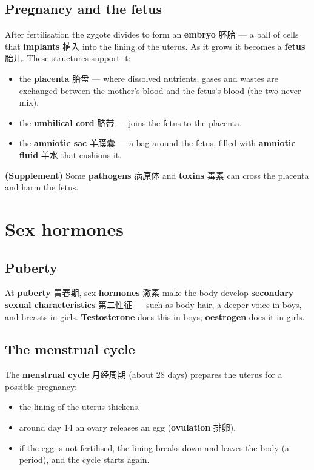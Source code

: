 \documentclass[11pt]{article}
\begin{document}
\subsection*{Pregnancy and the fetus}

After fertilisation the zygote divides to form an \textbf{embryo} 胚胎 — a ball of cells that \textbf{implants} 植入 into the lining of the uterus. As it grows it becomes a \textbf{fetus} 胎儿. These structures support it:

\begin{itemize}
\item the \textbf{placenta} 胎盘 — where dissolved nutrients, gases and wastes are exchanged between the mother's blood and the fetus's blood (the two never mix).

\item the \textbf{umbilical cord} 脐带 — joins the fetus to the placenta.

\item the \textbf{amniotic sac} 羊膜囊 — a bag around the fetus, filled with \textbf{amniotic fluid} 羊水 that cushions it.

\end{itemize}

\textbf{(Supplement)} Some \textbf{pathogens} 病原体 and \textbf{toxins} 毒素 can cross the placenta and harm the fetus.

\section*{Sex hormones}

\subsection*{Puberty}

At \textbf{puberty} 青春期, sex \textbf{hormones} 激素 make the body develop \textbf{secondary sexual characteristics} 第二性征 — such as body hair, a deeper voice in boys, and breasts in girls. \textbf{Testosterone} does this in boys; \textbf{oestrogen} does it in girls.

\subsection*{The menstrual cycle}

The \textbf{menstrual cycle} 月经周期 (about 28 days) prepares the uterus for a possible pregnancy:

\begin{itemize}
\item the lining of the uterus thickens.

\item around day 14 an ovary releases an egg (\textbf{ovulation} 排卵).

\item if the egg is not fertilised, the lining breaks down and leaves the body (a period), and the cycle starts again.

\end{itemize}
\end{document}

